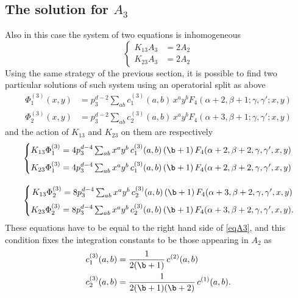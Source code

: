 \documentclass[a4paper,11pt,openright,twoside]{book}
\numberwithin{equation}{section}
\begin{document}
{{%
\subsection{The solution for $A_3$}
Also in this case the system of two equations is  inhomogeneous 
\begin{equation}
\left\{
\begin{split}
	K_{13} A_3 &=2A_2\\ 
	K_{23} A_3&=2A_2 
\end{split}\right.
\label{eqA3}
\end{equation}
Using the same strategy of the previous section,  it is possible to find two particular solutions of such system using an operatorial split as above
\begin{align}
\Phi_1^{(3)}(x,y)&= p_3^{d -2} \sum_{a b} c_1^{(3)}(a,b)\, x^a y^b   F_4(\alpha+2,\beta+1; \gamma,\gamma';x,y)\\
\Phi_2^{(3)}(x,y)&= p_3^{ d -2} \sum_{a b} c_2^{(3)}(a,b) \,x^a y^b   F_4(\alpha+3,\beta+1; \gamma,\gamma';x,y)
\end{align}
and the action of $K_{13}$ and $K_{23}$ on them are respectively
\begin{align}
&\left\{
\begin{matrix}
	K_{13}\Phi^{(3)}_1=4p_3^{d-4}\sum_{a b} x^a y^b\, c_1^{(3)}(a,b)\,(\b+1)\,F_4(\alpha+2,\beta+2,\gamma,\gamma',x,y)\\[1.5ex]
	K_{23}\Phi^{(3)}_1=4p_3^{d-4}\sum_{a b} x^a y^b\, c_1^{(3)}(a,b)\,(\b+1)\,F_4(\alpha+2,\beta+2,\gamma,\gamma',x,y)
\end{matrix}\right.\\[2.2ex]
&\left\{\begin{matrix}
	K_{13}\Phi^{(3)}_2=8p_3^{d-4}\sum_{a b} x^a y^b\, c_2^{(3)}(a,b)\,(\b+1)\,F_4(\alpha+3,\beta+2,\gamma,\gamma',x,y)\\[1.5ex]
	K_{23}\Phi^{(3)}_2=8p_3^{d-4}\sum_{a b} x^a y^b\, c_2^{(3)}(a,b)\,(\b+1)\,F_4(\alpha+3,\beta+2,\gamma,\gamma',x,y).
\end{matrix}\right.
\end{align}
These equations have to be equal to the right hand side of \eqref{eqA3}, and this condition fixes the integration constants to be those appearing in $A_2$ as
\begin{align}
c_1^{(3)}(a,b)&=\frac{1}{2(\b+1)}\,c^{(2)}(a,b)\\
c_2^{(3)}(a,b)&=\frac{1}{2(\b+1)(\b+2)}\,c^{(1)}(a,b).
\end{align}
}}
\end{document}
